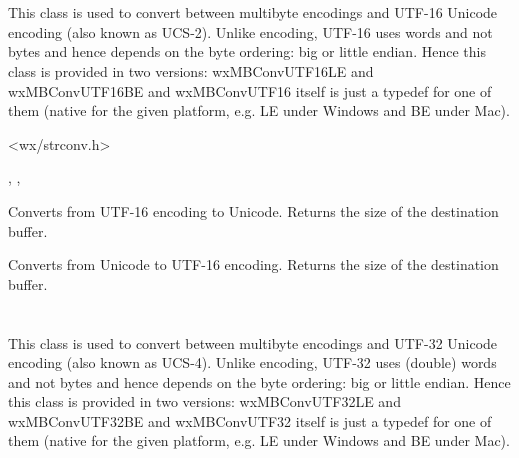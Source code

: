 \section{}\label{wxmbconvutf16}

This class is used to convert between multibyte encodings and UTF-16 Unicode
encoding (also known as UCS-2). Unlike  encoding,
UTF-16 uses words and not bytes and hence depends on the byte ordering:
big or little endian. Hence this class is provided in two versions:
wxMBConvUTF16LE and wxMBConvUTF16BE and wxMBConvUTF16 itself is just a typedef
for one of them (native for the given platform, e.g. LE under Windows and BE
under Mac).




<wx/strconv.h>


, 
, 


\label{wxmbconvutf16mb2wc}


Converts from UTF-16 encoding to Unicode. Returns the size of the destination
buffer.

\label{wxmbconvutf16wc2mb}


Converts from Unicode to UTF-16 encoding. Returns the size of the destination
buffer.


\section{}\label{wxmbconvutf32}

This class is used to convert between multibyte encodings and UTF-32 Unicode
encoding (also known as UCS-4). Unlike  encoding,
UTF-32 uses (double) words and not bytes and hence depends on the byte ordering:
big or little endian. Hence this class is provided in two versions:
wxMBConvUTF32LE and wxMBConvUTF32BE and wxMBConvUTF32 itself is just a typedef
for one of them (native for the given platform, e.g. LE under Windows and BE
under Mac).

